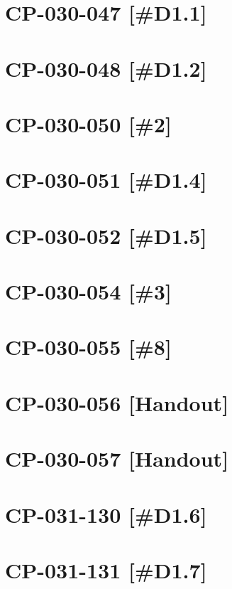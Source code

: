 



\section{CP-030-047 [\#D1.1]}\newpage
\section{CP-030-048 [\#D1.2]}\newpage
\section{CP-030-050 [\#2]}\newpage	
\section{CP-030-051 [\#D1.4]}\newpage

\setcounter{section}{0}

\section{CP-030-052 [\#D1.5]}\newpage	
\section{CP-030-054 [\#3]}\newpage	
\section{CP-030-055 [\#8]}\newpage	
\section{CP-030-056 [Handout]}\newpage	
\section{CP-030-057 [Handout]}\newpage	
\section{CP-031-130 [\#D1.6]}\newpage	
\section{CP-031-131 [\#D1.7]}\newpage

